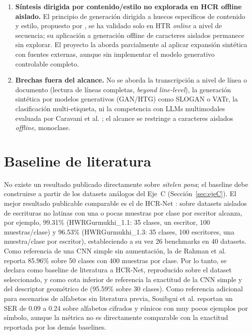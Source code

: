 \documentclass[conference]{IEEEtran}
\begin{document}
\begin{enumerate}
  los renderizados con distorsiones no lineales.
  \item \textbf{Síntesis dirigida por contenido/estilo no explorada en HCR offline aislado.} El principio de generación dirigida a huecos específicos de contenido y estilo, propuesto por \cite{chang_data_2022}, se ha validado solo en HTR \textit{online} a nivel de secuencia; su aplicación a generación offline de caracteres aislados permanece sin explorar. El proyecto la aborda parcialmente al aplicar expansión sintética con fuentes externas, aunque sin implementar el modelo generativo controlable completo.
  \item \textbf{Brechas fuera del alcance.} No se aborda la transcripción a
  nivel de línea o documento (lectura de líneas completas,
  \emph{beyond line-level}), la generación sintética por modelos generativos
  (GAN/HTG) como SLOGAN o VATr, la clasificación multi-etiqueta, ni la
  competencia con LLMs multimodales evaluada por Caravani et al.
  \cite{caravani_assessing_2027}; el alcance se restringe a caracteres
  aislados \textit{offline}, monoclase.
\end{enumerate}

\section{Baseline de literatura}
\label{sec:baseline}

No existe un resultado publicado directamente sobre \textit{sitelen pona};
el baseline debe construirse a partir de los datasets análogos del
Eje~C (Sección~\ref{sec:ejeC}). El mejor resultado publicable comparable es
el de HCR-Net \cite{hcrnet_2024}: sobre datasets aislados de escrituras no
latinas con una o pocas muestras por clase por escritor alcanza, por ejemplo,
99.31\% (HWRGurmukhi\_1.1: 35 clases, un escritor, 100 muestras/clase) y
96.53\% (HWRGurmukhi\_1.3: 35 clases, 100 escritores, una muestra/clase por
escritor), estableciendo a su vez 26 benchmarks en 40 datasets. Como
referencia de una CNN simple sin aumentación, la de Rahman et al.
\cite{bangla_cnn_2015} reporta 85.96\% sobre 50 clases con 400 muestras por
clase. Por lo tanto, se declara como baseline de literatura a HCR-Net,
reproducido sobre el dataset seleccionado, y como cota inferior de referencia
la exactitud de la CNN simple \cite{bangla_cnn_2015} y del descriptor
geométrico de \cite{chacko_wavelet_2012} (95.59\% sobre 30 clases). Como referencia adicional para escenarios de alfabetos sin literatura previa, Souibgui et al. \cite{souibgui_few_2022} reportan un SER de 0.09 a 0.24 sobre alfabetos cifrados y rúnicos con muy pocos ejemplos por símbolo, aunque la métrica no es directamente comparable con la exactitud reportada por los demás baselines.
\end{document}
